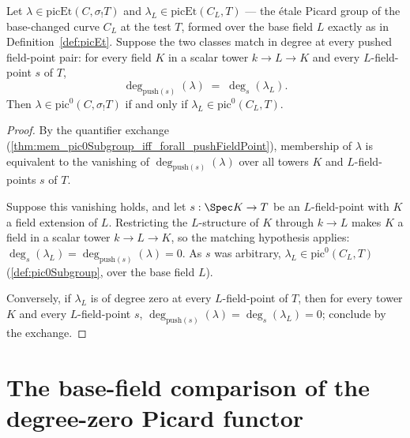 \begin{theorem}
  \label{thm:mem_pic0Subgroup_iff_of_degAt_pushFieldPoint_eq}
  \leanok
  Let \(\lambda \in \mathrm{picEt}(C, \sigma_{!}T)\) and
  \(\lambda_L \in \mathrm{picEt}(C_L, T)\) --- the \'etale Picard group of the
  base-changed curve \(C_L\) at the test \(T\), formed over the base field \(L\)
  exactly as in Definition~\ref{def:picEt}. Suppose the two classes match in degree at
  every pushed field-point pair: for every field \(K\) in a scalar tower
  \(k \to L \to K\) and every \(L\)-field-point \(s\) of \(T\),
  \[
    \deg_{\mathrm{push}(s)}(\lambda) \;=\; \deg_{s}(\lambda_L).
  \]
  Then \(\lambda \in \mathrm{pic}^0(C, \sigma_{!}T)\) if and only if
  \(\lambda_L \in \mathrm{pic}^0(C_L, T)\).
\end{theorem}
\begin{proof}
  \leanok
  By the quantifier exchange
  (\ref{thm:mem_pic0Subgroup_iff_forall_pushFieldPoint}), membership of \(\lambda\) is
  equivalent to the vanishing of \(\deg_{\mathrm{push}(s)}(\lambda)\) over all towers
  \(K\) and \(L\)-field-points \(s\) of \(T\).

  Suppose this vanishing holds, and let \(s : \Spec K \to T\) be an \(L\)-field-point
  with \(K\) a field extension of \(L\). Restricting the \(L\)-structure of \(K\)
  through \(k \to L\) makes \(K\) a field in a scalar tower \(k \to L \to K\), so the
  matching hypothesis applies:
  \(\deg_s(\lambda_L) = \deg_{\mathrm{push}(s)}(\lambda) = 0\). As \(s\) was
  arbitrary, \(\lambda_L \in \mathrm{pic}^0(C_L, T)\) (\ref{def:pic0Subgroup}, over
  the base field \(L\)).

  Conversely, if \(\lambda_L\) is of degree zero at every \(L\)-field-point of \(T\),
  then for every tower \(K\) and every \(L\)-field-point \(s\),
  \(\deg_{\mathrm{push}(s)}(\lambda) = \deg_s(\lambda_L) = 0\); conclude by the
  exchange.
\end{proof}

\section{The base-field comparison of the degree-zero Picard functor}
\label{sec:pic0Theta}

